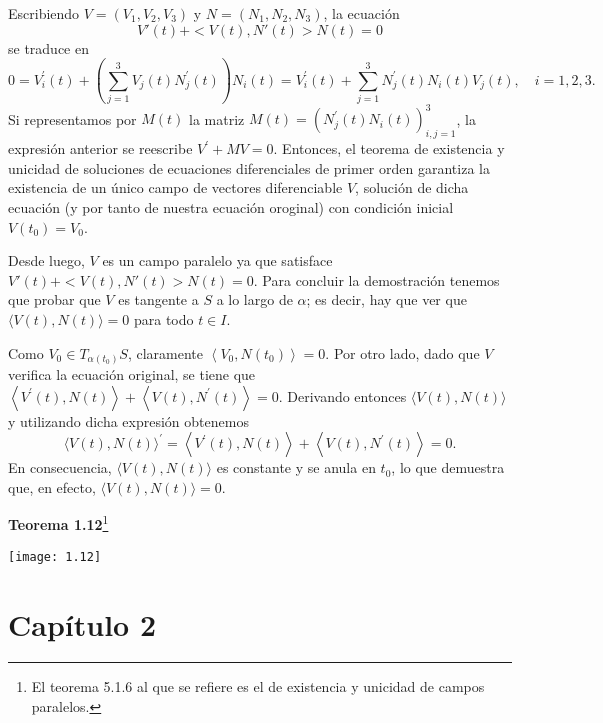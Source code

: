 \documentclass[openany]{book}
\begin{document}
\begin{demonstration}

  Escribiendo $V=\left(V_{1}, V_{2}, V_{3}\right)$ y $N=\left(N_{1}, N_{2}, N_{3}\right)$, la ecuación $$V'(t)+<V(t),N'(t)>N(t)=0$$ se traduce en
  $$
  0=V_{i}^{\prime}(t)+\left(\sum_{j=1}^{3} V_{j}(t) N_{j}^{\prime}(t)\right) N_{i}(t)=V_{i}^{\prime}(t)+\sum_{j=1}^{3} N_{j}^{\prime}(t) N_{i}(t) V_{j}(t), \quad i=1,2,3 .
  $$
  Si representamos por $M(t)$ la matriz $M(t)=\left(N_{j}^{\prime}(t) N_{i}(t)\right)_{i, j=1}^{3}$, la expresión anterior se reescribe $V^{\prime}+M V=0$. Entonces, el teorema de existencia y unicidad de soluciones de ecuaciones diferenciales de primer orden garantiza la existencia de un único campo de vectores diferenciable $V$, solución de dicha ecuación (y por tanto de nuestra ecuación oroginal) con condición inicial $V\left(t_{0}\right)=V_{0}$.

  Desde luego, $V$ es un campo paralelo ya que satisface $V'(t)+<V(t),N'(t)>N(t)=0$. Para concluir la demostración tenemos que probar que $V$ es tangente a $S$ a lo largo de $\alpha$; es decir, hay que ver que $\langle V(t), N(t)\rangle=0$ para todo $t \in I$.

  Como $V_{0} \in T_{\alpha\left(t_{0}\right)} S$, claramente $\left\langle V_{0}, N\left(t_{0}\right)\right\rangle=0$. Por otro lado, dado que $V$ verifica la ecuación original, se tiene que $\left\langle V^{\prime}(t), N(t)\right\rangle+\left\langle V(t), N^{\prime}(t)\right\rangle=0$. Derivando entonces $\langle V(t), N(t)\rangle$ y utilizando dicha expresión obtenemos
  $$
  \langle V(t), N(t)\rangle^{\prime}=\left\langle V^{\prime}(t), N(t)\right\rangle+\left\langle V(t), N^{\prime}(t)\right\rangle=0 .
  $$
  En consecuencia, $\langle V(t), N(t)\rangle$ es constante y se anula en $t_{0}$, lo que demuestra que, en efecto, $\langle V(t), N(t)\rangle=0$.
\end{demonstration}

\begin{center}
\textbf{Teorema 1.12}\footnote{El teorema 5.1.6 al que se refiere es el de existencia y unicidad de campos paralelos.}
\end{center}

\texttt{[image: 1.12]}





\chapter{Capítulo 2}
\end{document}
